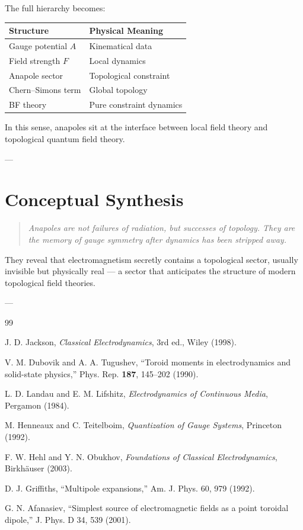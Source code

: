 \documentclass[11pt]{article}
\begin{document}
The full hierarchy becomes:

\begin{center}
\begin{tabular}{l|l}
Structure & Physical Meaning \\ \hline
Gauge potential $A$ & Kinematical data \\
Field strength $F$ & Local dynamics \\
Anapole sector & Topological constraint \\
Chern--Simons term & Global topology \\
BF theory & Pure constraint dynamics
\end{tabular}
\end{center}

In this sense, anapoles sit at the interface between local field theory and topological quantum field theory.

---

\section*{Conceptual Synthesis}

\begin{quote}
\emph{
Anapoles are not failures of radiation,  
but successes of topology.  
They are the memory of gauge symmetry after dynamics has been stripped away.
}
\end{quote}

They reveal that electromagnetism secretly contains a topological sector, usually invisible but physically real — a sector that anticipates the structure of modern topological field theories.

---



\begin{thebibliography}{99}

J. D. Jackson, \textit{Classical Electrodynamics}, 3rd ed., Wiley (1998).

V. M. Dubovik and A. A. Tugushev, 
``Toroid moments in electrodynamics and solid-state physics,'' 
Phys. Rep. \textbf{187}, 145–202 (1990).

L. D. Landau and E. M. Lifshitz, \textit{Electrodynamics of Continuous Media}, Pergamon (1984).

M. Henneaux and C. Teitelboim, \textit{Quantization of Gauge Systems}, Princeton (1992).

F. W. Hehl and Y. N. Obukhov, \textit{Foundations of Classical Electrodynamics}, Birkhäuser (2003).

D. J. Griffiths, ``Multipole expansions,'' Am. J. Phys. 60, 979 (1992).

G. N. Afanasiev, ``Simplest source of electromagnetic fields as a point toroidal dipole,'' J. Phys. D 34, 539 (2001).

\end{thebibliography}
\end{document}
